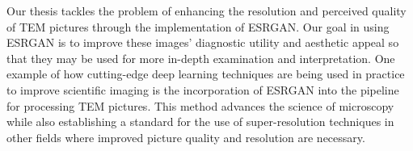 \vspace{10pt}
Our thesis tackles the problem of enhancing the resolution and perceived quality of TEM pictures through the implementation of ESRGAN. Our goal in using ESRGAN is to improve these images' diagnostic utility and aesthetic appeal so that they may be used for more in-depth examination and interpretation. One example of how cutting-edge deep learning techniques are being used in practice to improve scientific imaging is the incorporation of ESRGAN into the pipeline for processing TEM pictures. This method advances the science of microscopy while also establishing a standard for the use of super-resolution techniques in other fields where improved picture quality and resolution are necessary.